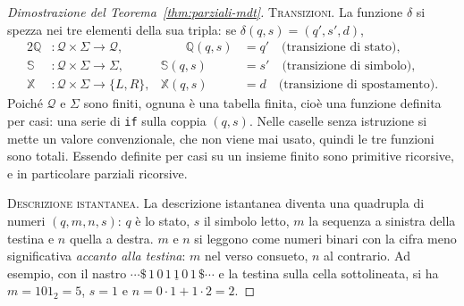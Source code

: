 \documentclass[a4paper, 11pt, oneside]{book}
\theoremstyle{formale}
\begin{document}
\begin{proof}[Dimostrazione del Teorema~\ref{thm:parziali-mdt}]
        \medskip
        \textsc{Transizioni}. La funzione $\delta$ si spezza nei tre elementi della sua
        tripla: se $\delta(q, s) = (q', s', d)$,
        \begin{alignat*}{2}
            \mathbb{Q} &\colon \mathcal{Q} \times \Sigma \to \mathcal{Q}, & \qquad \mathbb{Q}(q, s) &= q'
                \quad \text{(transizione di stato)}, \\
            \mathbb{S} &\colon \mathcal{Q} \times \Sigma \to \Sigma, & \mathbb{S}(q, s) &= s'
                \quad \text{(transizione di simbolo)}, \\
            \mathbb{X} &\colon \mathcal{Q} \times \Sigma \to \{L, R\}, & \mathbb{X}(q, s) &= d
                \quad \text{(transizione di spostamento)}.
        \end{alignat*}
        Poich\'e $\mathcal{Q}$ e $\Sigma$ sono finiti, ognuna \`e una tabella finita, cio\`e
        una funzione definita per casi: una serie di \texttt{if} sulla coppia $(q, s)$.
        Nelle caselle senza istruzione si mette un valore convenzionale, che non viene mai
        usato, quindi le tre funzioni sono totali. Essendo definite per casi su un insieme
        finito sono primitive ricorsive, e in particolare parziali ricorsive.

        \medskip
        \textsc{Descrizione istantanea}. La descrizione istantanea diventa una quadrupla
        di numeri $(q, m, n, s)$: $q$ \`e lo stato, $s$ il simbolo letto, $m$ la sequenza
        a sinistra della testina e $n$ quella a destra. $m$ e $n$ si leggono come numeri
        binari con la cifra meno significativa \emph{accanto alla testina}: $m$ nel verso
        consueto, $n$ al contrario. Ad esempio, con il nastro
        $\cdots \$\, 1\, 0\, 1\, \underline{1}\, 0\, 1\, \$ \cdots$ e la testina sulla
        cella sottolineata, si ha $m = 101_2 = 5$, $s = 1$ e
        $n = 0 \cdot 1 + 1 \cdot 2 = 2$.


\end{proof}
\end{document}
